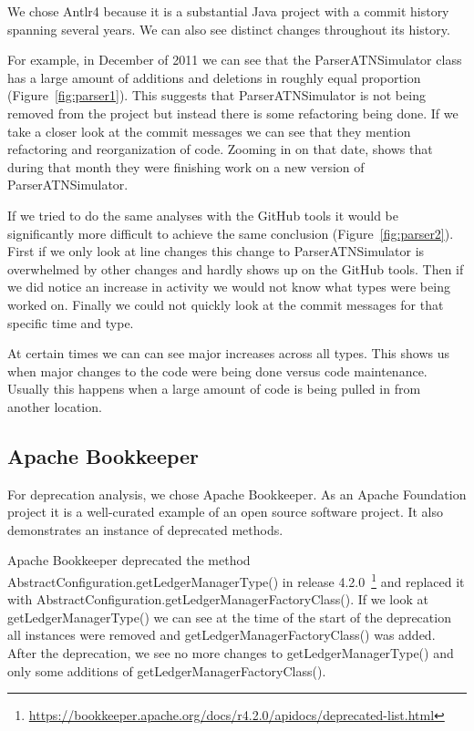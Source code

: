 \documentclass[conference]{IEEEtran}
\begin{document}
We chose Antlr4 because it is a substantial Java project with a commit history spanning several years. We can also see distinct changes throughout its history.

For example, in December of 2011 we can see that the ParserATNSimulator class has a large amount of additions and deletions in roughly equal proportion (Figure~\ref{fig:parser1}). This suggests that ParserATNSimulator is not being removed from the project but instead there is some refactoring being done. If we take a closer look at the commit messages we can see that they mention refactoring and reorganization of code. Zooming in on that date,  shows that during that month they were finishing work on a new version of ParserATNSimulator.


If we tried to do the same analyses with the GitHub tools it would be significantly more difficult to achieve the same conclusion (Figure~\ref{fig:parser2}). First if we only look at line changes this change to ParserATNSimulator is overwhelmed by other changes and hardly shows up on the GitHub tools. Then if we did notice an increase in activity we would not know what types were being worked on. Finally we could not quickly look at the commit messages for that specific time and type.

At certain times we can can see major increases across all types. This shows us when major changes to the code were being done versus code maintenance. Usually this happens when a large amount of code is being pulled in from another location.

\subsection{Apache Bookkeeper}

For deprecation analysis, we chose Apache Bookkeeper. As an Apache Foundation project it is a well-curated example of an open source software project. It also demonstrates an instance of deprecated methods. 

Apache Bookkeeper deprecated the method AbstractConfiguration.getLedgerManagerType() in release 4.2.0~\footnote{\url{https://bookkeeper.apache.org/docs/r4.2.0/apidocs/deprecated-list.html}} and replaced it with AbstractConfiguration.getLedgerManagerFactoryClass(). If we look at getLedgerManagerType() we can see at the time of the start of the deprecation all instances were removed and getLedgerManagerFactoryClass() was added. After the deprecation, we see no more changes to getLedgerManagerType() and only some additions of getLedgerManagerFactoryClass().
\end{document}
